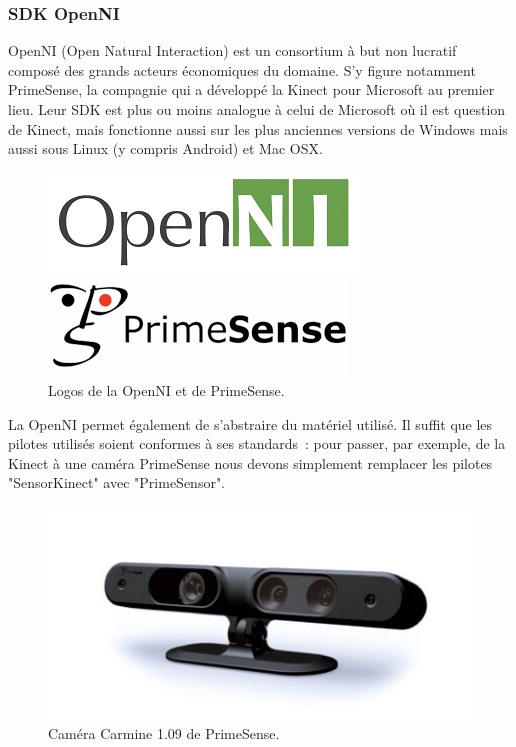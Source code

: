 \subsubsection{SDK OpenNI}
OpenNI (Open Natural Interaction) est un consortium à but non lucratif composé
des grands acteurs économiques du domaine. S'y figure notamment PrimeSense, la 
compagnie qui a développé la Kinect pour Microsoft au premier lieu. Leur SDK
est plus ou moins analogue à celui de Microsoft où il est question de
Kinect, mais fonctionne aussi sur les plus anciennes 
versions de Windows mais
aussi sous Linux (y compris Android) et Mac OSX.
\begin{figure}[h!]
\begin{minipage}{0.49\linewidth}
  \centering
  \includegraphics[width=0.9\linewidth]{images/openni_logo}
\end{minipage}
\begin{minipage}{0.49\linewidth}
  \centering
  \includegraphics[width=0.9\linewidth]{images/primesense_logo}
\end{minipage}

\caption{Logos de la OpenNI et de PrimeSense.}
\end{figure}
La OpenNI permet également de s'abstraire du matériel utilisé. Il suffit que
les pilotes utilisés soient conformes à ses standards~: pour passer, par 
exemple, de la Kinect à une caméra PrimeSense nous devons simplement remplacer 
les pilotes "SensorKinect" avec "PrimeSensor".
\begin{figure}[h!]
\centering
\includegraphics[width=0.6\linewidth]{images/primesense_camera}
\caption{Caméra Carmine 1.09 de PrimeSense.}
\end{figure}

